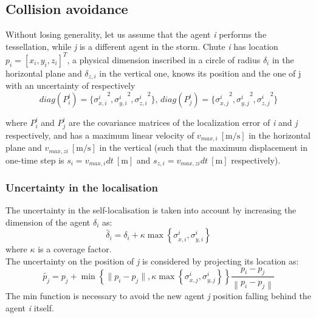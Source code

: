 \subsection{Collision avoidance}
Without losing generality, let us assume that the agent \textit{i} performs the tessellation, while \textit{j} is a different agent in the storm. Chute \textit{i} has location $p_i=\left[x_i, y_i, z_i\right]^T$, a physical dimension inscribed in a circle of radius $\delta_i$ in the horizontal plane and $\delta_{z,i}$ in the vertical one, knows its position and the one of j with an uncertainty of respectively
{\small
\begin{equation*}
  diag(P_i^i)=\{{ \sigma_{x,i}^{i}}^{2}, {\sigma_{y,i}^i}^{2}, {\sigma_{z,i}^i}^{2}\}, \,  diag(P_j^i)=\{{\sigma_{x,j}^i}^{2}, {\sigma_{y,j}^i}^{2}, {\sigma_{z,j}^i}^{2}\}
\end{equation*}
}

where $P_i^i$ and $P_j^i$ are the covariance matrices of the localization error of \textit{i} and \textit{j} respectively, 
and has a maximum linear velocity of $v_{max,i} \ \left[\si{\meter\per\second}\right]$ in the horizontal plane and $v_{max,zi} \ \left[\si{\meter\per\second}\right]$ in the vertical (such that the maximum displacement in one-time step is $s_i=v_{max,i}dt \ \left[\si{\meter}\right]$ and $s_{z,i}=v_{max,zi}dt \ \left[\si{\meter}\right]$ respectively). 

\subsubsection{Uncertainty in the localisation} 
  The uncertainty in the self-localisation is taken into account by increasing the dimension of the agent $\delta_i$ as:
    \begin{equation}
        \tilde{\delta_i}=\delta_i + \kappa \max \left\{\sigma_{x,i}^i, \sigma_{y,i}^i \right\}
        \label{eq:expand_dimension}
    \end{equation}
    where $\kappa$ is a coverage factor.\\
    The uncertainty on the position of \textit{j} is considered by projecting its location as:
    \begin{equation}
        \tilde{p_j} = p_j + \min\left\{ \lVert p_i-p_j \lVert, \kappa \max\left\{\sigma_{x,j}^i, \sigma_{y,j}^i\right\}\right\}\frac{p_i - p_j}{\left\lVert p_i - p_j \right\lVert}
    \end{equation}
   The min function is necessary to avoid the new agent \textit{j} position falling behind the agent \textit{i} itself.   
    
